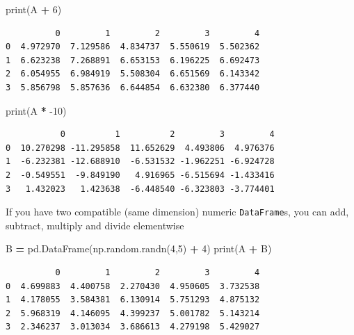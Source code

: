 \documentclass[
  letterpaper,
]{scrbook}
\newenvironment{Shaded}{\begin{snugshade}}{\end{snugshade}}
\newcommand{\BuiltInTok}[1]{#1}
\newcommand{\DecValTok}[1]{\textcolor[rgb]{0.00,0.00,0.81}{#1}}
\newcommand{\NormalTok}[1]{#1}
\newcommand{\OperatorTok}[1]{\textcolor[rgb]{0.81,0.36,0.00}{\textbf{#1}}}
\begin{document}
\begin{Shaded}
\begin{Highlighting}[]
\BuiltInTok{print}\NormalTok{(A }\OperatorTok{+} \DecValTok{6}\NormalTok{)}
\end{Highlighting}
\end{Shaded}

\begin{verbatim}
          0         1         2         3         4
0  4.972970  7.129586  4.834737  5.550619  5.502362
1  6.623238  7.268891  6.653153  6.196225  6.692473
2  6.054955  6.984919  5.508304  6.651569  6.143342
3  5.856798  5.857636  6.644854  6.632380  6.377440
\end{verbatim}

\begin{Shaded}
\begin{Highlighting}[]
\BuiltInTok{print}\NormalTok{(A }\OperatorTok{*} \DecValTok{-10}\NormalTok{)}
\end{Highlighting}
\end{Shaded}

\begin{verbatim}
           0          1          2         3         4
0  10.270298 -11.295858  11.652629  4.493806  4.976376
1  -6.232381 -12.688910  -6.531532 -1.962251 -6.924728
2  -0.549551  -9.849190   4.916965 -6.515694 -1.433416
3   1.432023   1.423638  -6.448540 -6.323803 -3.774401
\end{verbatim}

If you have two compatible (same dimension) numeric \texttt{DataFrame}s, you can add, subtract, multiply and divide elementwise

\begin{Shaded}
\begin{Highlighting}[]
\NormalTok{B }\OperatorTok{=}\NormalTok{ pd.DataFrame(np.random.randn(}\DecValTok{4}\NormalTok{,}\DecValTok{5}\NormalTok{) }\OperatorTok{+} \DecValTok{4}\NormalTok{)}
\BuiltInTok{print}\NormalTok{(A }\OperatorTok{+}\NormalTok{ B)}
\end{Highlighting}
\end{Shaded}

\begin{verbatim}
          0         1         2         3         4
0  4.699883  4.400758  2.270430  4.950605  3.732538
1  4.178055  3.584381  6.130914  5.751293  4.875132
2  5.968319  4.146095  4.399237  5.001782  5.143214
3  2.346237  3.013034  3.686613  4.279198  5.429027
\end{verbatim}
\end{document}

